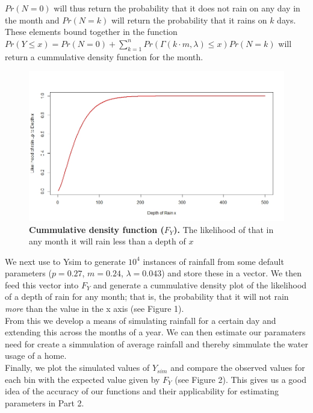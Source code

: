 \documentclass[a4paper, 11pt, oneside]{article}
\begin{document}
$Pr(N = 0)$ will thus return the probability that it does not rain on any day in the month and $Pr(N = k)$ will return the probability that it rains on $k$ days.  These elements bound together in the function $Pr(Y \leq x) = Pr(N = 0) + \sum_{k=1}^n Pr(\Gamma(k \cdot m, \lambda) \leq x) Pr(N=k)$ will return a cummulative density function for the month.\\

\begin{figure}[h]
\centering
\caption{\textbf{Cummulative density function ($F_Y$).}  The likelihood of that in any month it will rain less than a depth of $x$}
\includegraphics[width = \textwidth]{CDF}
\end{figure}

We next use to Ysim to generate $10^4$ instances of rainfall from some default parameters ($p=0.27$, $m=0.24$, $\lambda = 0.043$) and store these in a vector.  We then feed this vector into $F_Y$ and generate a cummulative density plot of the likelihood of a depth of rain for any month; that is, the probability that it will not rain \emph{more} than the value in the x axis (see Figure 1).\\

From this we develop a means of simulating rainfall for a certain day and extending this across the months of a year.  We can then estimate our paramaters need for create a simmulation of average rainfall and thereby simmulate the water usage of a home.\\

Finally, we plot the simulated values of $Y_{sim}$ and compare the observed values for each bin with the expected value given by $F_Y$ (see Figure 2).  This gives us a good idea of the accuracy of our functions and their applicability for estimating parameters in Part 2.\\
\end{document}
